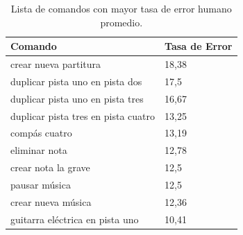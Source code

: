 \begin{table}[H]
\centering
\footnotesize
\begin{tabular}{|l|p{3cm}|}
\hline
Comando & Tasa de Error \\
\hline
crear nueva partitura & 18,38 \\
duplicar pista uno en pista dos & 17,5 \\
duplicar pista uno en pista tres & 16,67 \\
duplicar pista tres en pista cuatro & 13,25 \\
comp\'as cuatro & 13,19 \\
eliminar nota & 12,78 \\
crear nota la grave & 12,5 \\
pausar m\'usica & 12,5 \\
crear nueva m\'usica & 12,36 \\
guitarra el\'ectrica en pista uno & 10,41 \\
\hline
\end{tabular}
\caption{Lista de comandos con mayor tasa de error humano promedio.}
\label{sec:tabla-lista-comandos-error}
\end{table}

